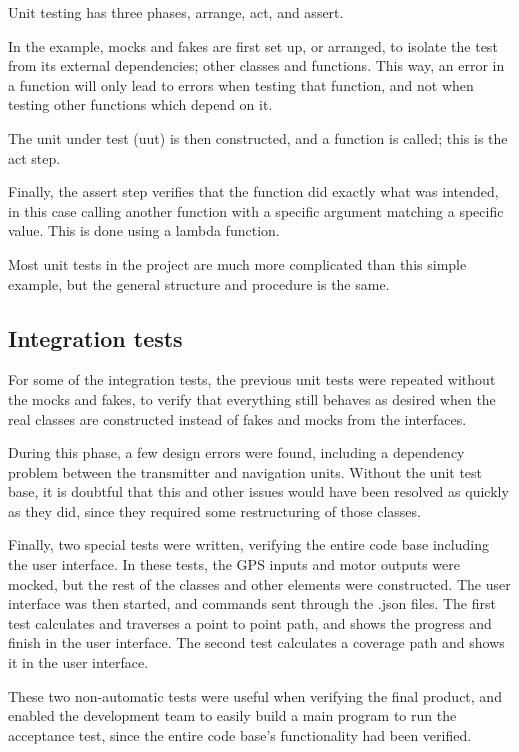 Unit testing has three phases, arrange, act, and assert. 

In the example, mocks and fakes are first set up, or arranged, to isolate the test from its external dependencies; other classes and functions. This way, an error in a function will only lead to errors when testing that function, and not when testing other functions which depend on it. 

The unit under test (uut) is then constructed, and a function is called; this is the act step. 

Finally, the assert step verifies that the function did exactly what was intended, in this case calling another function with a specific argument matching a specific value. This is done using a lambda function.

Most unit tests in the project are much more complicated than this simple example, but the general structure and procedure is the same. 

\subsection{Integration tests}

For some of the integration tests, the previous unit tests were repeated without the mocks and fakes, to verify that everything still behaves as desired when the real classes are constructed instead of fakes and mocks from the interfaces.

During this phase, a few design errors were found, including a dependency problem between the transmitter and navigation units. Without the unit test base, it is doubtful that this and other issues would have been resolved as quickly as they did, since they required some restructuring of those classes. 

Finally, two special tests were written, verifying the entire code base including the user interface. In these tests, the GPS inputs and motor outputs were mocked, but the rest of the classes and other elements were constructed. The user interface was then started, and commands sent through the .json files. The first test calculates and traverses a point to point path, and shows the progress and finish in the user interface. The second test calculates a coverage path and shows it in the user interface.

These two non-automatic tests were useful when verifying the final product, and enabled the development team to easily build a main program to run the acceptance test, since the entire code base's functionality had been verified.

